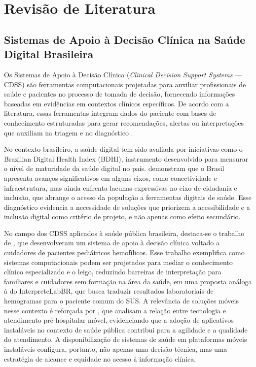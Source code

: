 \documentclass[12pt]{article}
\begin{document}
\section{Revisão de Literatura}

\subsection{Sistemas de Apoio à Decisão Clínica na Saúde Digital Brasileira}

Os Sistemas de Apoio à Decisão Clínica (\textit{Clinical Decision Support
Systems} — CDSS) são ferramentas computacionais projetadas para auxiliar
profissionais de saúde e pacientes no processo de tomada de decisão,
fornecendo informações baseadas em evidências em contextos clínicos
específicos. De acordo com a literatura, essas ferramentas integram dados
do paciente com bases de conhecimento estruturadas para gerar
recomendações, alertas ou interpretações que auxiliam na triagem e no
diagnóstico \cite{bauermann2024}.

No contexto brasileiro, a saúde digital tem sido avaliada por iniciativas
como o Brazilian Digital Health Index (BDHI), instrumento desenvolvido para
mensurar o nível de maturidade da saúde digital no país. \cite{cruz2022}
demonstram que o Brasil apresenta avanços significativos em alguns eixos,
como conectividade e infraestrutura, mas ainda enfrenta lacunas expressivas
no eixo de cidadania e inclusão, que abrange o acesso da população a
ferramentas digitais de saúde. Esse diagnóstico evidencia a necessidade de
soluções que priorizem a acessibilidade e a inclusão digital como critério
de projeto, e não apenas como efeito secundário.

No campo dos CDSS aplicados à saúde pública brasileira, destaca-se o
trabalho de \cite{bauermann2024}, que desenvolveram um sistema de apoio à
decisão clínica voltado a cuidadores de pacientes pediátricos hemofílicos.
Esse trabalho exemplifica como sistemas computacionais podem ser projetados
para mediar o conhecimento clínico especializado e o leigo, reduzindo
barreiras de interpretação para familiares e cuidadores sem formação na
área da saúde, em uma proposta análoga à do InterpreteLabBR, que busca
traduzir resultados laboratoriais de hemogramas para o paciente comum do
SUS. A relevância de soluções móveis nesse contexto é reforçada por
\cite{torrente2024}, que analisam a relação entre tecnologia e atendimento
pré-hospitalar móvel, evidenciando que a adoção de aplicativos instaláveis
no contexto de saúde pública contribui para a agilidade e a qualidade do
atendimento. A disponibilização de sistemas de saúde em plataformas móveis
instaláveis configura, portanto, não apenas uma decisão técnica, mas uma
estratégia de alcance e equidade no acesso à informação clínica.
\end{document}
